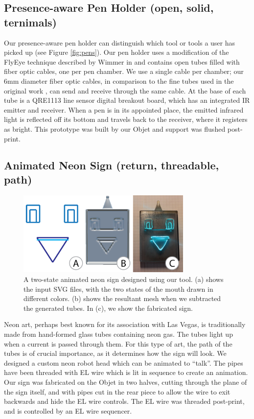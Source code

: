 \subsection{Presence-aware Pen Holder (open, solid, ternimals)}

Our presence-aware pen holder can distinguish which tool or tools a user has picked up (see Figure \ref{fig:pens}).  Our pen holder uses a modification of the FlyEye technique described by Wimmer in \cite{Wimmer-flyeye} and contains open tubes filled with fiber optic cables, one per pen chamber.  We use a single cable per chamber; our 6mm diameter fiber optic cables, in comparison to the fine tubes used in the original work , can send and receive through the same cable.  At the base of each tube is a QRE1113 line sensor digital breakout board, which has an integrated IR emitter and receiver.   When a pen is in its appointed place, the emitted infrared light is reflected off its bottom and travels back to the receiver, where it registers as bright.  This prototype was built by our Objet and support was flushed post-print. 

\subsection{Animated Neon Sign (return, threadable, path)}

\begin{figure}[h!]
\centering
    \includegraphics[width=3.4in]{figures/sign.png}
\caption{A two-state animated neon sign designed using our tool.  (a) shows the input SVG files, with the two states of the mouth drawn in different colors.   (b) shows the resultant mesh when we subtracted the generated tubes.  In (c), we show the fabricated sign.}
\label{fig:neon}
\end{figure}

Neon art, perhaps best known for its association with Las Vegas, is traditionally made from hand-formed glass tubes containing neon gas.  The tubes light up when a current is passed through them.  For this type of art, the path of the tubes is of crucial importance, as it determines how the sign will look.  We designed a custom neon robot head which can be animated to ``talk''.  The pipes have been threaded with EL wire which is lit in sequence to create an animation.  Our sign was fabricated on the Objet in two halves, cutting through the plane of the sign itself, and with pipes cut in the rear piece to allow the wire to exit backwards and hide the EL wire controls.  The EL wire was threaded post-print, and is controlled by an EL wire sequencer.

